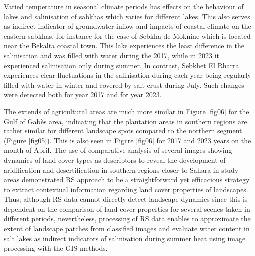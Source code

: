 \documentclass[land,article,submit,pdftex,moreauthors]{Definitions/mdpi}
\begin{document}
Varied temperature in seasonal climate periods has effects on the behaviour of lakes and salinisation of sabkhas which varies for different lakes. This also serves as indirect indicator of groundwater inflow and impacts of coastal climate on the eastern sabkhas, for instance for the case of Sebkha de Moknine which is located near the Bekalta coastal town. This lake experiences the least difference in the salinisation and was filled with water during the 2017, while in 2023 it experienced salinisation only during summer. In contrast, Sebkhet El Rharra experiences clear fluctuations in the salinisation during each year being regularly filled with water in winter and covered by salt crust during July. Such changes were detected both for year 2017 and for year 2023.

The extends of agricultural areas are much more similar in Figure \ref{fig06} for the Gulf of Gabès area, indicating that the plantation areas in southern regions are rather similar for different landscape spots compared to the northern segment (Figure \ref{fig05}). This is also seen in Figure \ref{fig06} for 2017 and 2023 years on the month of April. The use of comparative analysis of several images showing dynamics of land cover types as descriptors to reveal the development of aridification and desertification in southern regions closer to Sahara in study areas demonstrated RS approach to be a straightforward yet efficacious strategy to extract contextual information regarding land cover properties of landscapes. Thus, although RS data cannot directly detect landscape dynamics since this is dependent on the comparison of land cover properties for several scenes taken in different periods, nevertheless, processing of RS data enables to approximate the extent of landscape patches from classified images and evaluate water content in salt lakes as indirect indicators of salinisation during summer heat using image processing with the GIS methods. 
\end{document}
